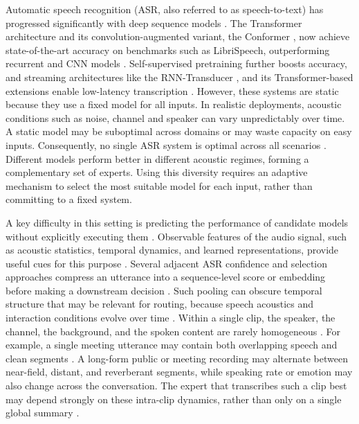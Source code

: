 \documentclass[journal]{IEEEtran}
\begin{document}
Automatic speech recognition (ASR, also referred to as speech-to-text) has progressed significantly with deep sequence models \cite{hinton_deepn,dahl_context,deng_conf}. The Transformer architecture \cite{vaswani2017attention} and its convolution-augmented variant, the Conformer \cite{gulati2020conformer}, now achieve state-of-the-art accuracy on benchmarks such as LibriSpeech, outperforming recurrent and CNN models \cite{deng_conf,bigssl}. Self-supervised pretraining \cite{baevski2020wav2vec,hsu2021hubert,chen2022wavlm} further boosts accuracy, and streaming architectures like the RNN-Transducer \cite{Graves2012SequenceTW}, and its Transformer-based extensions enable low-latency transcription \cite{gong_advanced,lee_mle}. However, these systems are static because they use a fixed model for all inputs. In realistic deployments, acoustic conditions such as noise, channel and speaker can vary unpredictably over time. A static model may be suboptimal across domains or may waste capacity on easy inputs. Consequently, no single ASR system is optimal across all scenarios \cite{li2014overviewrobust,cornell23_chime,cornell24_chime}. Different models perform better in different acoustic regimes, forming a complementary set of experts. Using this diversity requires an adaptive mechanism to select the most suitable model for each input, rather than committing to a fixed system.

A key difficulty in this setting is predicting the performance of candidate models without explicitly executing them \cite{kerschke2019algorithm_selection}. Observable features of the audio signal, such as acoustic statistics, temporal dynamics, and learned representations, provide useful cues for this purpose \cite{baevski2020wav2vec,hsu2021hubert,li2014overviewrobust,bell2021adaptation}. Several adjacent ASR confidence and selection approaches compress an utterance into a sequence-level score or embedding before making a downstream decision \cite{kumar2020utterance_confidence,swarup2019acoustic_hypothesis_embeddings,li2021rebm}. Such pooling can obscure temporal structure that may be relevant for routing, because speech acoustics and interaction conditions evolve over time \cite{li2014overviewrobust,li2023asr_emotional_speech}. Within a single clip, the speaker, the channel, the background, and the spoken content are rarely homogeneous \cite{li2014overviewrobust,cornell23_chime,bell2021adaptation,vinnikov2024notsofar1}. For example, a single meeting utterance may contain both overlapping speech and clean segments \cite{cornell23_chime,vinnikov2024notsofar1,yoshioka2018overlapped_meetings,cornell2024chime8}. A long-form public or meeting recording may alternate between near-field, distant, and reverberant segments, while speaking rate or emotion may also change across the conversation. The expert that transcribes such a clip best may depend strongly on these intra-clip dynamics, rather than only on a single global summary \cite{kumar2020utterance_confidence,li2023asr_emotional_speech}.
\end{document}
